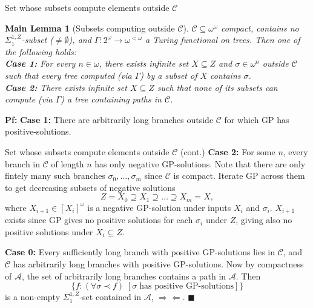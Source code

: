 \begin{frame}{Set whose subsets compute elements outside $\mathcal{C}$}
  \newtheorem*{main-lemma*}{Main Lemma}
  \begin{main-lemma*}[Subsets computing outside $\mathcal{C}$]
    $\mathcal{C}\subseteq\omega^\omega$ compact, contains no
    $\Sigma_1^{1,Z}$-subset ($\neq\emptyset$), and
    $\Gamma:2^{\omega}\rightarrow \omega^{<\omega}$ a Turing functional on
    trees. Then one of the following holds:\\
    \vspace{0.5em}
    \textbf{Case 1:} For every $n\in\omega$, there exists infinite set
    $X\subseteq Z$ and $\sigma\in\omega^n$ outside $\mathcal{C}$ such that
    every tree computed (via $\Gamma$) by a subset of $X$ contains
    $\sigma$.\\
    \vspace{0.5em}
    \textbf{Case 2:} There exists infinite set $X\subseteq Z$ such that
    none of its subsets can compute (via $\Gamma$) a tree containing paths
    in $\mathcal{C}$.
  \end{main-lemma*}

  \vspace{1em}
  \textbf{Pf:} \textbf{Case 1:} There are arbitrarily long branches outside
  $\mathcal{C}$ for which GP has positive-solutions.
\end{frame}

\begin{frame}{Set whose subsets compute elements outside $\mathcal{C}$
(cont.)}
  \textbf{Case 2:} For some $n$, every branch in $\mathcal{C}$ of length
  $n$ has only negative GP-solutions. Note that there are only fintely many
  such branches $\sigma_0,\ldots,\sigma_m$ since $\mathcal{C}$ is compact.
  Iterate GP across them to get decreasing subsets of negative solutions
  \[Z=X_0 \supseteq X_1 \supseteq \ldots\supseteq X_m=X,\]
  where $X_{i+1}\in[X_i]^\omega$ is a negative GP-solution under inputs
  $X_i$ and $\sigma_i$. $X_{i+1}$ exists since GP gives no positive
  solutions for each $\sigma_i$ under $Z$, giving also no positive
  solutions under $X_i\subseteq Z$.

  \vspace{0.5em}
  \textbf{Case 0:} Every sufficiently long branch with positive
  GP-solutions lies in $\mathcal{C}$, and $\mathcal{C}$ has arbitrarily
  long branches with positive GP-solutions. Now by compactness of
  $\mathcal{A}$, the set of arbitrarily long branches contains a path
  in $\mathcal{A}$. Then \[\{f:(\forall \sigma\prec f)\; [\sigma\; \text{has
  positive GP-solutions}]\}\] is a non-empty $\Sigma_1^{1,Z}$-set contained
  in $\mathcal{A}$, $\Rightarrow\Leftarrow$. $\blacksquare$
\end{frame}

